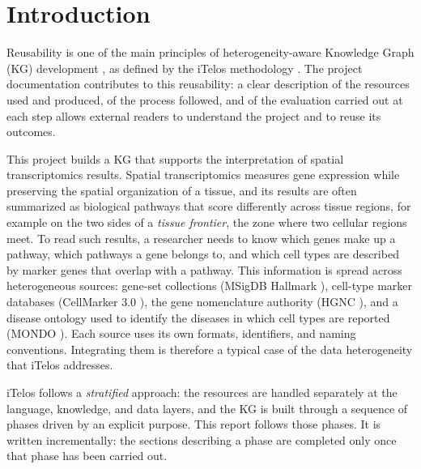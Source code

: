 \section{Introduction}

Reusability is one of the main principles of heterogeneity-aware Knowledge Graph (KG) development \cite{p4,p6}, as defined by the iTelos methodology \cite{p1,p2,p3,p5}. The project documentation contributes to this reusability: a clear description of the resources used and produced, of the process followed, and of the evaluation carried out at each step allows external readers to understand the project and to reuse its outcomes.

\noindent This project builds a KG that supports the interpretation of spatial transcriptomics results. Spatial transcriptomics measures gene expression while preserving the spatial organization of a tissue, and its results are often summarized as biological pathways that score differently across tissue regions, for example on the two sides of a \emph{tissue frontier}, the zone where two cellular regions meet. To read such results, a researcher needs to know which genes make up a pathway, which pathways a gene belongs to, and which cell types are described by marker genes that overlap with a pathway. This information is spread across heterogeneous sources: gene-set collections (MSigDB Hallmark \cite{liberzon2015molecular}), cell-type marker databases (CellMarker 3.0 \cite{hu2026cellmarker}), the gene nomenclature authority (HGNC \cite{seal2026genenames}), and a disease ontology used to identify the diseases in which cell types are reported (MONDO \cite{vasilevsky2026mondo}). Each source uses its own formats, identifiers, and naming conventions. Integrating them is therefore a typical case of the data heterogeneity that iTelos addresses.

\noindent iTelos follows a \emph{stratified} approach: the resources are handled separately at the language, knowledge, and data layers, and the KG is built through a sequence of phases driven by an explicit purpose. This report follows those phases. It is written incrementally: the sections describing a phase are completed only once that phase has been carried out.

